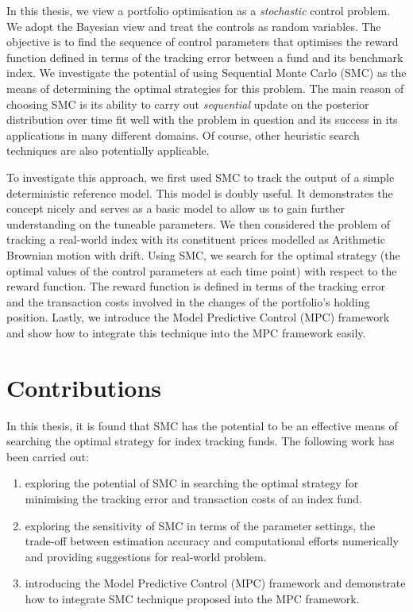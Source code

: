 In this thesis, we view a portfolio optimisation as a \emph{stochastic} control problem. We adopt the Bayesian view and treat the controls as random variables. The objective is to find the sequence of control parameters that optimises the reward function defined in terms of the tracking error between a fund and its benchmark index. We investigate the potential of using Sequential Monte Carlo (SMC) as the means of determining the optimal strategies for this problem. The main reason of choosing SMC is its ability to carry out \emph{sequential} update on the posterior distribution over time fit well with the problem in question and its success in its applications in many different domains. Of course, other heuristic search techniques are also potentially applicable.

To investigate this approach, we first used SMC to track the output of a simple deterministic reference model. This model is doubly useful. It demonstrates the concept nicely and serves as a basic model to allow us to gain further understanding on the tuneable parameters. We then considered the problem of tracking a real-world index with its constituent prices modelled as Arithmetic Brownian motion with drift. Using SMC, we search for the optimal strategy (the optimal values of the control parameters at each time point) with respect to the reward function. The reward function is defined in terms of the tracking error and the transaction costs involved in the changes of the portfolio's holding position. Lastly, we introduce the Model Predictive Control (MPC) framework and show how to integrate this technique into the MPC framework easily.

\section{Contributions}
In this thesis, it is found that SMC has the potential to be an effective means of searching the optimal strategy for index tracking funds. The following work has been carried out:
\begin{enumerate}
\item exploring the potential of SMC in searching the optimal strategy for minimising the tracking error and transaction costs of an index fund. 
\item exploring the sensitivity of SMC in terms of the parameter settings, the trade-off between estimation accuracy and computational efforts numerically and providing suggestions for real-world problem.
\item introducing the Model Predictive Control (MPC) framework and demonstrate how to integrate SMC technique proposed into the MPC framework.
\end{enumerate}

